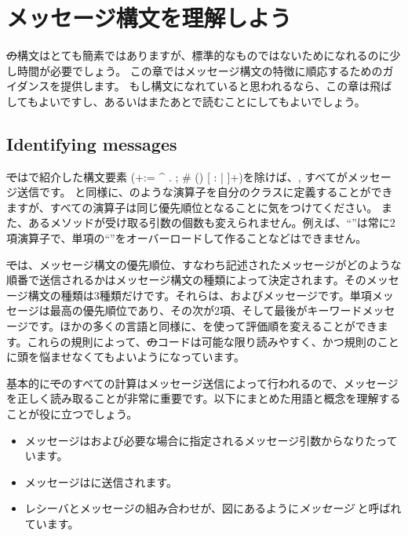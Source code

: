 \documentclass[a4paper,10pt,twoside]{book}
\begin{document}
	\renewcommand{\nnbb}[2]{} %
	\sloppy
\fi
\chapter{メッセージ構文を理解しよう}

\st の構文はとても簡素ではありますが、標準的なものではないためになれるのに少し時間が必要でしょう。
この章ではメッセージ構文の特徴に順応するためのガイダンスを提供します。
もし構文になれていると思われるなら、この章は飛ばしてもよいですし、あるいはまたあとで読むことにしてもよいでしょう。

\section{Identifying messages}

\st ではで紹介した構文要素 (\ct+:= ^ . ; # () {} [ : | ]+)を除けば、, すべてがメッセージ送信です。
と同様に、\ct{+}のような演算子を自分のクラスに定義することができますが、すべての演算子は同じ優先順位となることに気をつけてください。
また、あるメソッドが受け取る引数の個数も変えられません。例えば、``\ct{-}''は常に2項演算子で、単項の``\ct{-}''をオーバーロードして作ることなどはできません。

\st では、メッセージ構文の優先順位、すなわち記述されたメッセージがどのような順番で送信されるかはメッセージ構文の種類によって決定されます。そのメッセージ構文の種類は3種類だけです。それらは、およびメッセージです。単項メッセージは最高の優先順位であり、その次が2項、そして最後がキーワードメッセージです。ほかの多くの言語と同様に、を使って評価順を変えることができます。これらの規則によって、\st のコードは可能な限り読みやすく、かつ規則のことに頭を悩ませなくてもよいようになっています。

基本的に\st でのすべての計算はメッセージ送信によって行われるので、メッセージを正しく読み取ることが非常に重要です。以下にまとめた用語と概念を理解することが役に立つでしょう。

\begin{itemize}
  \item メッセージはおよび必要な場合に指定されるメッセージ引数からなりたっています。
  \item メッセージはに送信されます。
  \item レシーバとメッセージの組み合わせが、図にあるように\emph{メッセージ} と呼ばれています。
\end{itemize}
\end{document}
